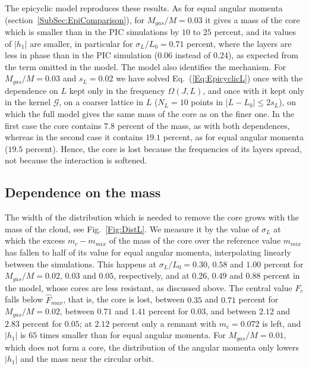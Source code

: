 The epicyclic model reproduces these results. As for equal angular momenta (section~\ref{SubSec:EpiComparison}), for $M_{gas}/M = 0.03$ it gives a mass of the core which is smaller than in the PIC simulations by $10$ to $25$ percent, and its values of $|h_1|$ are smaller, in particular for $\sigma_L/L_0 = 0.71$ percent, where the layers are less in phase than in the PIC simulation ($0.06$ instead of $0.24$), as expected from the term omitted in the model. The model also identifies the mechanism. For $M_{gas}/M = 0.03$ and $s_L = 0.02$ we have solved Eq.~(\ref{Eq:EpicyclicL}) once with the dependence on $L$ kept only in the frequency $\Omega(J,L)$, and once with it kept only in the kernel $\mathcal{G}$, on a coarser lattice in $L$ ($N_L = 10$ points in $|L - L_0|\leq 2 s_L$), on which the full model gives the same mass of the core as on the finer one. In the first case the core contains $7.8$ percent of the mass, as with both dependences, whereas in the second case it contains $19.1$ percent, as for equal angular momenta ($19.5$ percent). Hence, the core is lost because the frequencies of its layers spread, not because the interaction is softened.


\subsection{Dependence on the mass}
\label{SubSec:DistBoundary}

The width of the distribution which is needed to remove the core grows with the mass of the cloud, see Fig.~\ref{Fig:DistL}. We measure it by the value of $\sigma_L$ at which the excess $m_c - m_{mix}$ of the mass of the core over the reference value $m_{mix}$ has fallen to half of its value for equal angular momenta, interpolating linearly between the simulations. This happens at $\sigma_L/L_0 = 0.30$, $0.58$ and $1.00$ percent for $M_{gas}/M = 0.02$, $0.03$ and $0.05$, respectively, and at $0.26$, $0.49$ and $0.88$ percent in the model, whose cores are less resistant, as discussed above. The central value $\hat{F}_c$ falls below $\hat{F}_{max}$, that is, the core is lost, between $0.35$ and $0.71$ percent for $M_{gas}/M = 0.02$, between $0.71$ and $1.41$ percent for $0.03$, and between $2.12$ and $2.83$ percent for $0.05$; at $2.12$ percent only a remnant with $m_c = 0.072$ is left, and $|h_1|$ is $65$ times smaller than for equal angular momenta. For $M_{gas}/M = 0.01$, which does not form a core, the distribution of the angular momenta only lowers $|h_1|$ and the mass near the circular orbit.

